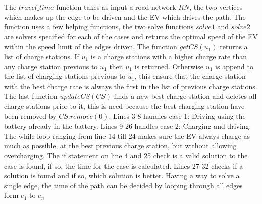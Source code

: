 The $travel\_time$ function takes as input a road network $RN$, the two vertices which makes up the edge to be driven and the EV which drives the path. The function uses a few helping functions, the two solve functions $solve1$ and $solve2$ are solvers specified for each of the cases and returns the optimal speed of the EV within the speed limit of the edges driven. The function $getCS(u_1)$ returns a list of charge stations. If $u_1$ is a charge stations with a higher charge rate than any charge station previous to $u_1$ then $u_1$ is returned. Otherwise $u_1$ is append to the list of charging stations previous to $u_1$, this ensure that the charge station with the best charge rate is always the first in the list of previous charge stations. The last function $updateCS(CS)$ finds a new best charge station and deletes all charge stations prior to it, this is need because the best charging station have been removed by $CS.remove(0)$. Lines 3-8 handles case 1: Driving using the battery already in the battery. Lines 9-26 handles case 2: Charging and driving. The while loop ranging from line 14 till 24 makes sure the EV always charge as much as possible, at the best previous charge station, but without allowing overcharging. The if statement on line 4 and 25 check is a valid solution to the case is found, if so, the time for the case is calculated. Lines 27-32 checks if a solution is found and if so, which solution is better. Having a way to solve a single edge, the time of the path can be decided by looping through all edges form $e_1$ to $e_n$

